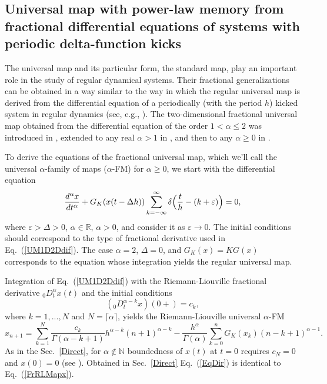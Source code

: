 \documentclass[graybox]{svmult}
\begin{document}
\subsection{Universal map with power-law memory from 
fractional differential equations of systems with 
periodic delta-function kicks}
\label{SecUFM}


The universal map and its particular form, the standard map, play an
important role in the study of regular dynamical systems. Their fractional
generalizations can be obtained in a way similar to the way in which the
regular universal map is derived from the differential equation of a
periodically (with the period $h$) kicked system in regular dynamics (see, e.g., \cite{ZasBook}). The
two-dimensional fractional universal map obtained from the differential
equation of the order $1 < \alpha \le 2$ was introduced in \cite{T1},
extended to any real $\alpha >1$ in \cite{T2009a,T2009b,T2}, and then to
any $\alpha \ge 0$ in \cite{ME3,ME4,ME7}.


 

To derive the equations of the fractional universal map, which we'll call
the universal $\alpha$-family of maps ($\alpha$-FM) for $\alpha \ge 0$, 
we start with the differential equation 
\begin{equation}
\frac{d^{\alpha}x}{dt^{\alpha}}+G_K(x(t- \Delta h)) \sum^{\infty}_{k=-\infty} \delta \Bigl(\frac{t}{h}-(k+\varepsilon)
\Bigr)=0,   
\label{UM1D2Ddif}
\end{equation}
where $\varepsilon > \Delta > 0$,  $\alpha \in \mathbb{R}$, $\alpha>0$,
and consider 
it as $\varepsilon  \rightarrow 0$. The initial conditions
should correspond to the type of fractional derivative
used in Eq.~(\ref{UM1D2Ddif}).
The case $\alpha =2$, $\Delta = 0$, and $G_K(x)=KG(x)$  
corresponds to the equation whose integration yields the regular
universal map. 

Integration of Eq.~(\ref{UM1D2Ddif}) with the Riemann-Liouville fractional
derivative $_0D^{\alpha}_tx(t)$ and the initial conditions  
\begin{equation}
(_0D^{\alpha-k}_tx)(0+)=c_k, 
\label{ic}
\end{equation}
where $k=1,...,N$ and $N=\lceil \alpha \rceil$, yields the
Riemann-Liouville universal $\alpha$-FM 
\begin{equation}
x_{n+1}=  \sum^{N}_{k=1}\frac{c_k}{\Gamma(\alpha-k+1)}h^{\alpha -k}(n+1)^{\alpha -k}-\frac{h^{\alpha}}{\Gamma(\alpha)}\sum^{n}_{k=0} G_K(x_k) (n-k+1)^{\alpha-1}. 
\label{FrRLMapx} 
\end{equation}
As in the Sec.~\ref{Direct}, for $\alpha \not\in \mathbb{N}$  
boundedness of $x(t)$ at $t=0$ requires $c_N=0$ and
$x(0)=0$ (see \cite{KST,Podlubny,SKM}). 
Obtained in Sec.~\ref{Direct} Eq.~(\ref{EqDir}) is identical to Eq.~(\ref{FrRLMapx}).
\end{document}
